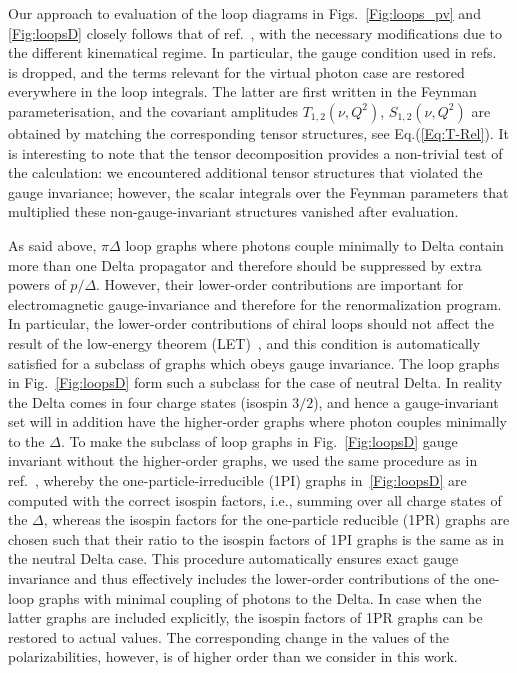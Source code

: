 \documentclass[prc,twocolumn,showpacs,preprintnumbers,amsmath,amssymb
,superscriptaddress,a4paper,nofootinbib
]{revtex4-1}
\begin{document}
 


Our approach to evaluation of the loop diagrams in Figs.~\ref{Fig:loops_pv} and \ref{Fig:loopsD} closely follows that of ref.~\cite{Lensky:2009uv},
with the necessary modifications due to the different kinematical regime. In particular, the gauge condition used in refs.~\cite{Pascalutsa:2002pi,Lensky:2009uv}
is dropped, and the terms relevant for the virtual photon case are restored everywhere in the loop integrals.
The latter are first written in the Feynman parameterisation, and the covariant amplitudes $T_{1,2}(\nu,Q^2)$, $S_{1,2}(\nu,Q^2)$
are obtained by matching the corresponding tensor structures, see Eq.(\ref{Eq:T-Rel}).
It is interesting to note that the tensor decomposition provides a non-trivial test of the calculation: we encountered additional tensor structures
that violated the gauge invariance; however, the scalar integrals over the Feynman parameters that multiplied these non-gauge-invariant structures
vanished after evaluation.

As said above, $\pi \Delta$ loop graphs where photons couple minimally to Delta contain more 
than one Delta propagator and therefore should be suppressed by extra powers of $p/\varDelta$.
However, their lower-order contributions are important for electromagnetic gauge-invariance and therefore for the 
renormalization program. In particular, the lower-order contributions of chiral loops should not affect the result of the low-energy
theorem (LET)~\cite{Low:1954kd}, and this condition is automatically satisfied for a subclass of graphs which obeys gauge invariance. The loop graphs in 
Fig.~\ref{Fig:loopsD} form such a subclass for the case of neutral Delta. In reality the Delta comes in four charge states (isospin $3/2$), and hence a 
gauge-invariant set will in addition have the higher-order graphs where photon couples minimally to the $\Delta$. To make the subclass of loop graphs 
in Fig.~\ref{Fig:loopsD} gauge invariant without the higher-order graphs, we used the same procedure as in ref.~\cite{Lensky:2009uv},
whereby the one-particle-irreducible (1PI) graphs in~\ref{Fig:loopsD} are computed with the correct isospin factors, i.e., summing over all charge 
states of the $\Delta$, whereas the isospin factors for the one-particle reducible (1PR) graphs are chosen such that their ratio to the isospin factors
of 1PI graphs is the same as in the neutral Delta case. This procedure automatically ensures exact gauge invariance and thus 
effectively includes the lower-order contributions of the one-loop graphs with minimal coupling of photons to the Delta. In case when the latter graphs 
are included explicitly, the isospin factors of 1PR graphs can be restored to actual values.
The corresponding change in the values of the polarizabilities, however, is of higher order than we consider in this work.
\end{document}
